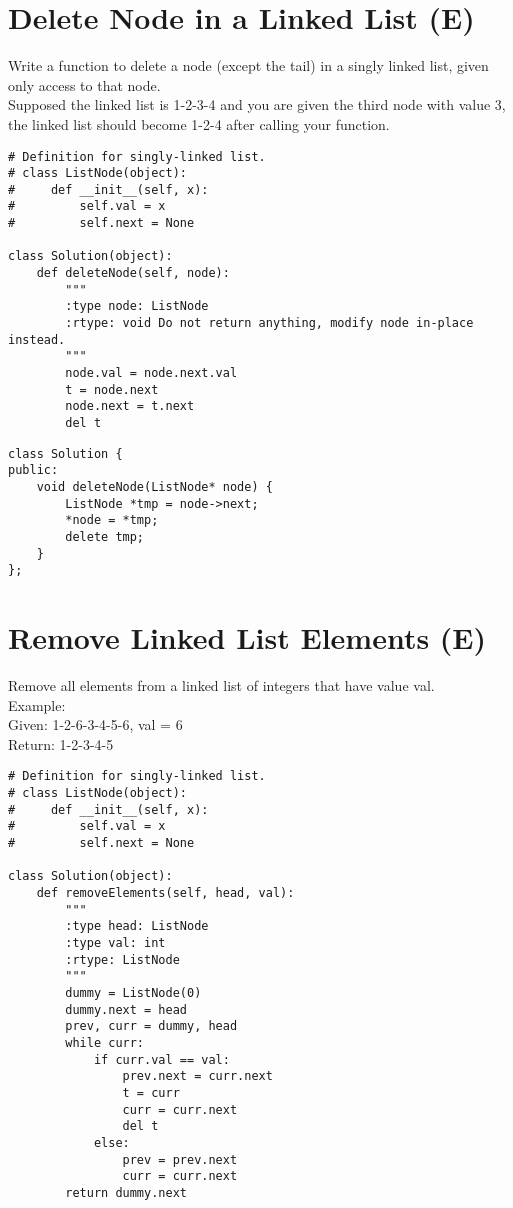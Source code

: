 \section{Delete Node in a Linked List (E)}
Write a function to delete a node (except the tail) in a singly linked list, given only access to that node.\\

Supposed the linked list is 1-2-3-4 and you are given the third node with value 3, the linked list should become 1-2-4 after calling your function. \\

\begin{lstlisting}
# Definition for singly-linked list.
# class ListNode(object):
#     def __init__(self, x):
#         self.val = x
#         self.next = None

class Solution(object):
    def deleteNode(self, node):
        """
        :type node: ListNode
        :rtype: void Do not return anything, modify node in-place instead.
        """
        node.val = node.next.val
        t = node.next
        node.next = t.next
        del t
\end{lstlisting}

\begin{lstlisting}
class Solution {
public:
    void deleteNode(ListNode* node) {
        ListNode *tmp = node->next;
        *node = *tmp;
        delete tmp;
    }
};
\end{lstlisting} 


\section{Remove Linked List Elements (E)}
Remove all elements from a linked list of integers that have value val.\\

Example:\\
Given: 1-2-6-3-4-5-6, val = 6\\
Return: 1-2-3-4-5 \\

\begin{lstlisting}
# Definition for singly-linked list.
# class ListNode(object):
#     def __init__(self, x):
#         self.val = x
#         self.next = None

class Solution(object):
    def removeElements(self, head, val):
        """
        :type head: ListNode
        :type val: int
        :rtype: ListNode
        """
        dummy = ListNode(0)
        dummy.next = head
        prev, curr = dummy, head
        while curr:
            if curr.val == val:
                prev.next = curr.next  
                t = curr
                curr = curr.next
                del t
            else:
                prev = prev.next
                curr = curr.next
        return dummy.next
\end{lstlisting}

